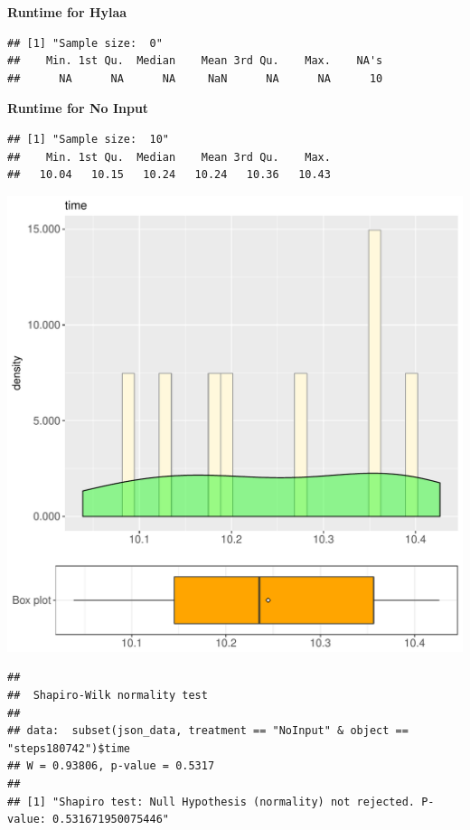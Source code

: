 \documentclass{article}\usepackage[]{graphicx}\usepackage[]{color}
\makeatletter
\def\maxwidth{ %
  \ifdim\Gin@nat@width>\linewidth
    \linewidth
  \else
    \Gin@nat@width
  \fi
}
\newenvironment{kframe}{%
 \def\at@end@of@kframe{}%
 \ifinner\ifhmode%
  \def\at@end@of@kframe{\end{minipage}}%
  \begin{minipage}{\columnwidth}%
 \fi\fi%
 \def\FrameCommand##1{\hskip\@totalleftmargin \hskip-\fboxsep
 \colorbox{shadecolor}{##1}\hskip-\fboxsep
     \hskip-\linewidth \hskip-\@totalleftmargin \hskip\columnwidth}%
 \MakeFramed {\advance\hsize-\width
   \@totalleftmargin\z@ \linewidth\hsize
   \@setminipage}}%
 {\par\unskip\endMakeFramed%
 \at@end@of@kframe}
\newenvironment{knitrout}{}{} %
\makeatother
\begin{document}
 \textbf{Runtime for Hylaa}
\begin{knitrout}
\color{fgcolor}\begin{kframe}
\begin{verbatim}
## [1] "Sample size:  0"
##    Min. 1st Qu.  Median    Mean 3rd Qu.    Max.    NA's 
##      NA      NA      NA     NaN      NA      NA      10
\end{verbatim}
\end{kframe}
\end{knitrout}
 \textbf{Runtime for No Input}
\begin{knitrout}
\color{fgcolor}\begin{kframe}
\begin{verbatim}
## [1] "Sample size:  10"
##    Min. 1st Qu.  Median    Mean 3rd Qu.    Max. 
##   10.04   10.15   10.24   10.24   10.36   10.43
\end{verbatim}
\end{kframe}
\includegraphics[width=\maxwidth]{figure/RH4_NoInput_steps180742-1} 
\begin{kframe}\begin{verbatim}
## 
## 	Shapiro-Wilk normality test
## 
## data:  subset(json_data, treatment == "NoInput" & object == "steps180742")$time
## W = 0.93806, p-value = 0.5317
## 
## [1] "Shapiro test: Null Hypothesis (normality) not rejected. P-value: 0.531671950075446"
\end{verbatim}
\end{kframe}
\end{knitrout}
  
\end{document}
